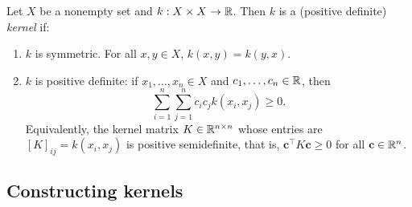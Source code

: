 \begin{definition}[kernel]
    Let \(X\) be a nonempty set and \(k : X \times X \to \mathbb{R}\).
    Then \(k\) is a (positive definite) \textit{kernel} if:
    \begin{enumerate}
        \item \(k\) is symmetric.
        For all \(x,y \in X\), \(k(x,y) = k(y,x)\).
        \item \(k\) is positive definite: if \(x_1, \dots, x_n \in X\) and \(c_1, \dots, c_n \in \mathbb{R}\), then
        \[\sum_{i=1}^{n}\sum_{j=1}^{n} c_i c_j k(x_i, x_j) \geq 0.\]
        Equivalently, the kernel matrix \(K \in \mathbb{R}^{n \times n}\) whose entries are \([K]_{ij} = k(x_i, x_j)\) is positive semidefinite, that is, \(\mathbf{c}^\top K \mathbf{c} \geq 0\) for all \(\mathbf{c} \in \mathbb{R}^n\).
    \end{enumerate}
\end{definition}


\subsection{Constructing kernels}

